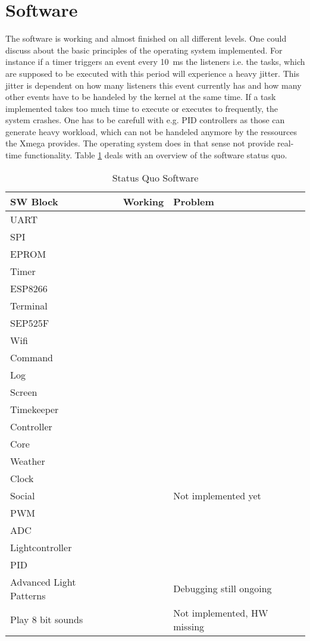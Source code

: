 \section{Software}
\label{sec:evaluation_sw}
The software is working and almost finished on all different levels. One could
discuss about the basic principles of the operating system implemented. For
instance if a timer triggers an event every \SI{10}{\milli\second} the listeners
i.e. the tasks, which are supposed to be executed with this period will
experience a heavy jitter. This jitter is dependent on how many listeners this
event currently has and how many other events have to be handeled by the kernel at the same time. If a task implemented takes too much time to execute or executes to
frequently, the system crashes. One has to be carefull with e.g. PID controllers
as those can generate heavy workload, which can not be handeled anymore by the
ressources the Xmega provides. The operating system does in that sense not
provide real-time functionality.
\newpar
Table \ref{tab:sw_status_quo} deals with an overview of the software status quo.
\begin{table}[H]
	\centering
	\begin{tabularx}{\textwidth}{llX}
		\textbf{SW Block}  	& \textbf{Working}& \textbf{Problem}
		\\\hline
		UART 		& \checkmark	&
		\\
		SPI	  	& \checkmark    &
		\\
		EPROM   	& \checkmark    &
		\\
		Timer   	& \checkmark    &
		\\	
		ESP8266		& \checkmark	&
		\\
		Terminal	& \checkmark	&
		\\
		SEP525F		& \checkmark	&
		\\
		Wifi		& \checkmark 	&
		\\
		Command		& \checkmark	&
		\\
		Log		& \checkmark	&
		\\
		Screen		& \checkmark	&
		\\
		Timekeeper	& \checkmark	&
		\\
		Controller	&		&
		\\
		Core		& \checkmark	&
		\\
		Weather		& \checkmark	&
		\\
		Clock		& \checkmark	&
		\\
		Social		& 		& Not implemented yet
		\\
		PWM & \checkmark & \\
		ADC & \checkmark & \\
		Lightcontroller & \checkmark & \\
		PID & \checkmark & \\
		Advanced Light Patterns &  & Debugging still ongoing\\
		Play 8 bit sounds & & Not implemented, HW missing\\
		\hline
	\end{tabularx}
	\caption{Status Quo Software}
	\label{tab:sw_status_quo}
\end{table}

